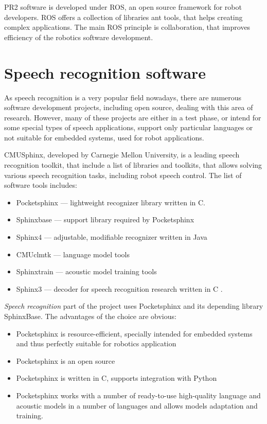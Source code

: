\documentclass[11pt,a4paper]{report}
\begin{document}
 PR2 software is developed under ROS, an open source framework
for robot developers. ROS offers a collection of libraries ant tools, that helps creating
complex applications. The main ROS principle is collaboration, that improves
efficiency of the robotics software development. 

\section {Speech recognition software}
As speech recognition is a very popular field nowadays, there are numerous
software development projects, including open source, dealing with this area of
research. However, many of these projects are either in a test phase, or
intend for some special types of speech applications, support only particular
languages or not suitable for embedded systems, used for robot applications. 

 CMUSphinx, developed by Carnegie Mellon University, is
a leading speech recognition toolkit, that include a list of libraries and
toolkits, that allows solving various speech recognition tasks, including robot speech control.  The list of software tools includes:
\begin {itemize}
  \item 
Pocketsphinx — lightweight recognizer library written in C.
\item Sphinxbase — support library required by Pocketsphinx
\item Sphinx4 — adjustable, modifiable recognizer written in Java
\item CMUclmtk — language model tools
\item Sphinxtrain — acoustic model training tools
\item Sphinx3 — decoder for speech recognition research written in C
\citep{CMUSphinx}.
\end{itemize}
 \textit {Speech recognition} part of the project  uses Pocketsphinx and its depending library SphinxBase. The advantages
 of the choice are obvious:
 \begin {itemize}
   \item Pocketsphinx is resource-efficient, specially intended for embedded
   systems and thus perfectly suitable for robotics application
   \item Pocketsphinx is an open source
   \item Pocketsphinx is written in C, supports integration with Python 
   \item Pocketsphinx works with a number of ready-to-use high-quality
   language and acoustic models in a number of languages and allows models
   adaptation and training. 
 \end{itemize}
\end{document}
